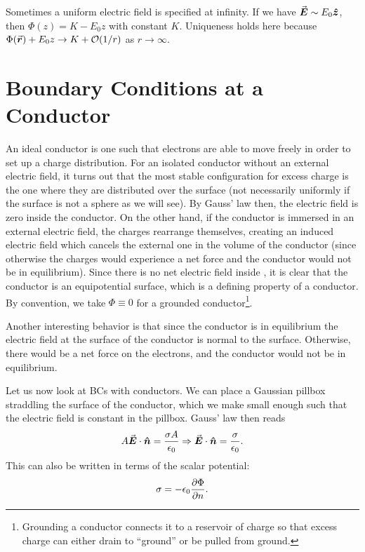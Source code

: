 Sometimes a uniform electric field is specified at infinity.
If we have $\va*{E} \sim E_0 \vu*{z}$, then $\Phi(z) = K - E_0 z$ with constant $K$.
Uniqueness holds here because $\Phi(\va*{r}) + E_0 z \rightarrow K + \mathcal{O}(1/r)$ as $r \rightarrow \infty$.

\section{Boundary Conditions at a Conductor}

An ideal conductor is one such that electrons are able to move freely in order to set up a charge distribution.
For an isolated conductor without an external electric field, it turns out that the most stable configuration for excess charge is the one where they are distributed over the surface (not necessarily uniformly if the surface is not a sphere as we will see).
By Gauss' law then, the electric field is zero inside the conductor.
On the other hand, if the conductor is immersed in an external electric field, the charges rearrange themselves, creating an induced electric field which cancels the external one in the volume of the conductor (since otherwise the charges would experience a net force and the conductor would not be in equilibrium).
Since there is no net electric field inside , it is clear that the conductor is an equipotential surface, which is a defining property of a conductor.
By convention, we take $\Phi \equiv 0$ for a grounded conductor\footnote{Grounding a conductor connects it to a reservoir of charge so that excess charge can either drain to ``ground'' or be pulled from ground.}.

Another interesting behavior is that since the conductor is in equilibrium the electric field at the surface of the conductor is normal to the surface.
Otherwise, there would be a net force on the electrons, and the conductor would not be in equilibrium.

Let us now look at BCs with conductors.
We can place a Gaussian pillbox straddling the surface of the conductor, which we make small enough such that the electric field is constant in the pillbox.
Gauss' law then reads
\begin{eqnarray}
    A \va*{E} \cdot \vu*{n} = \frac{\sigma A}{\epsilon_0} \Rightarrow \va*{E} \cdot \vu*{n} = \frac{\sigma}{\epsilon_0}
.\end{eqnarray}
This can also be written in terms of the scalar potential:
\begin{eqnarray}
    \sigma = -\epsilon_0 \pdv{\Phi}{n}
.\end{eqnarray}


